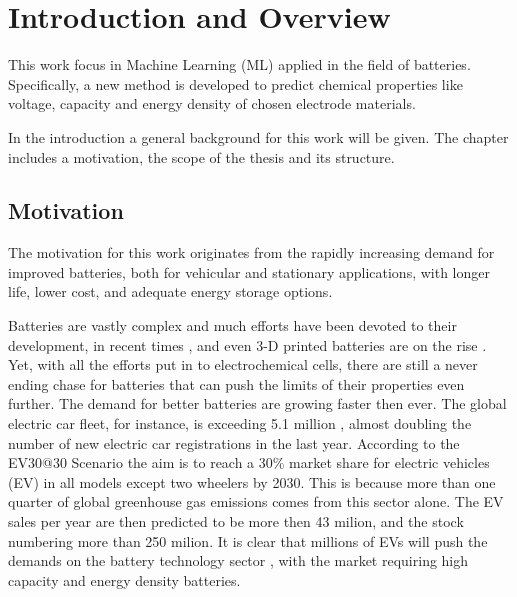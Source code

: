 \section{Introduction and Overview}

	This work focus in Machine Learning (\ac{ML}) applied in the field of batteries. Specifically, a new method is developed to predict chemical properties like voltage, capacity and energy density of chosen electrode materials.

	In the introduction a general background for this work will be given. The chapter includes a motivation, the scope of the thesis and its structure. 
 

\subsection{Motivation}

The motivation for this work originates from the rapidly increasing demand for improved batteries, both for vehicular and stationary applications, with longer life, lower cost, and adequate energy storage options.





Batteries are vastly complex and much efforts have been devoted to their development, in recent times \cite{blomgren2016development} \cite{hosaka2020research} \cite{cao2020batteries}, and even 3-D printed batteries are on the rise \cite{pang2020additive}. Yet, with all the efforts put in to electrochemical cells, there are still a never ending chase for batteries that can push the limits of their properties even further. The demand for better batteries are growing faster then ever. The global electric car fleet, for instance, is exceeding 5.1 million , almost doubling the number of new electric car registrations in the last year. According to the EV30@30 Scenario \cite{international2018global} the aim is to reach a $30\%$ market share for electric vehicles (\ac{EV}) in all models except two wheelers by 2030. This is because more than one quarter of global greenhouse gas emissions comes from this sector alone. The EV sales per year are then predicted to be more then 43 milion, and the stock numbering more than 250 milion. It is clear that millions of EVs will push the demands on the battery technology sector \cite{xiong2020overview}, with the market requiring high capacity and energy density batteries. 


